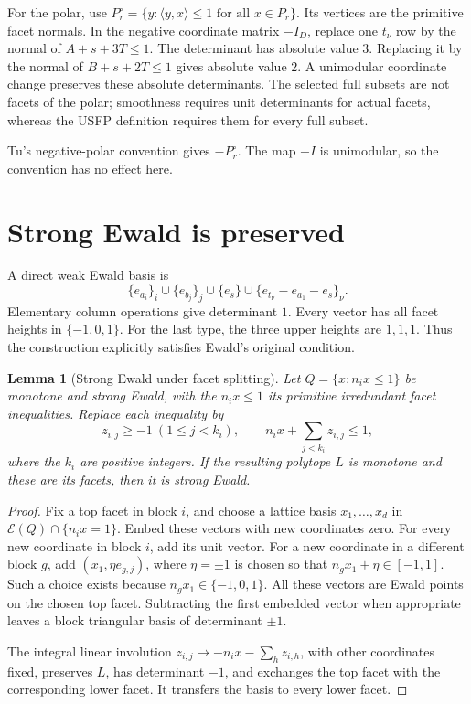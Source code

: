 \documentclass[11pt]{article}
\newtheorem{lemma}[theorem]{Lemma}
\theoremstyle{remark}\newtheorem{remark}[theorem]{Remark}
\newcommand{\E}{\mathcal E}
\begin{document}
For the polar, use \(P_r^\circ=\{y:\langle y,x\rangle\le1
\text{ for all }x\in P_r\}\).
Its vertices are the primitive facet normals.
In the negative coordinate matrix \(-I_D\), replace one \(t_\nu\) row
by the normal of \(A+s+3T\le1\). The determinant has absolute value \(3\).
Replacing it by the normal of \(B+s+2T\le1\) gives absolute value \(2\).
A unimodular coordinate change preserves these absolute determinants.
The selected full subsets are not facets of the polar; smoothness
requires unit determinants for actual facets, whereas the USFP
definition requires them for every full subset.

Tu's negative-polar convention gives \(-P_r^\circ\).
The map \(-I\) is unimodular, so the convention has no effect here.

\section{Strong Ewald is preserved}

A direct weak Ewald basis is
\begin{equation}\label{eq:weakbasis}
 \{e_{a_i}\}_i\cup\{e_{b_j}\}_j\cup\{e_s\}\cup
 \{e_{t_\nu}-e_{a_1}-e_s\}_\nu .
\end{equation}
Elementary column operations give determinant \(1\).
Every vector has all facet heights in \(\{-1,0,1\}\).
For the last type, the three upper heights are \(1,1,1\).
Thus the construction explicitly satisfies Ewald's original condition.

\begin{lemma}[Strong Ewald under facet splitting]\label{lem:splitstrong}
Let \(Q=\{x:n_i x\le1\}\) be monotone and strong Ewald, with the
\(n_i x\le1\) its primitive irredundant facet inequalities.
Replace each inequality by
\[
 z_{i,j}\ge-1\ (1\le j<k_i),\qquad
 n_i x+\sum_{j<k_i}z_{i,j}\le1,
\]
where the \(k_i\) are positive integers.
If the resulting polytope \(L\) is monotone and these are its facets,
then it is strong Ewald.
\end{lemma}
\begin{proof}
Fix a top facet in block \(i\), and choose a lattice basis
\(x_1,\ldots,x_d\) in \(\E(Q)\cap\{n_i x=1\}\).
Embed these vectors with new coordinates zero.
For every new coordinate in block \(i\), add its unit vector.
For a new coordinate in a different block \(g\), add
\((x_1,\eta e_{g,j})\), where \(\eta=\pm1\) is chosen so that
\(n_gx_1+\eta\in[-1,1]\). Such a choice exists because
\(n_gx_1\in\{-1,0,1\}\).
All these vectors are Ewald points on the chosen top facet.
Subtracting the first embedded vector when appropriate leaves a
block triangular basis of determinant \(\pm1\).

The integral linear involution
\(z_{i,j}\mapsto -n_i x-\sum_hz_{i,h}\), with other coordinates fixed,
preserves \(L\), has determinant \(-1\), and exchanges the top facet
with the corresponding lower facet. It transfers the basis to every
lower facet.
\end{proof}
\end{document}
